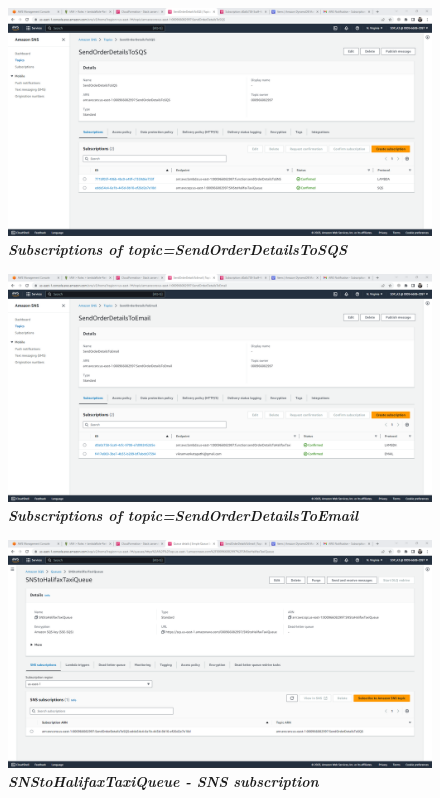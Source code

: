     \begin{figure}[htp]
        \centering
        \includegraphics[scale=1, width=15cm]{PROBLEM 3/Screenshots/3.1 subscriptions of topic=SendOrderDetailsToSQS.png}
        \caption{\textbf{\textit{Subscriptions of topic=SendOrderDetailsToSQS}}}
        \label{fig:}
    \end{figure}

    \begin{figure}[htp]
        \centering
        \includegraphics[scale=1, width=15cm]{PROBLEM 3/Screenshots/3.2 subscriptions of topic=SendOrderDetailsToEmail.png}
        \caption{\textbf{\textit{Subscriptions of topic=SendOrderDetailsToEmail}}}
        \label{fig:}
    \end{figure}

    \begin{figure}[htp]
        \centering
        \includegraphics[scale=1, width=15cm]{PROBLEM 3/Screenshots/3.3 SNStoHalifaxTaxiQueue - SNS subscriptions.png}
        \caption{\textbf{\textit{SNStoHalifaxTaxiQueue - SNS subscription}}}
        \label{fig:}
    \end{figure}

